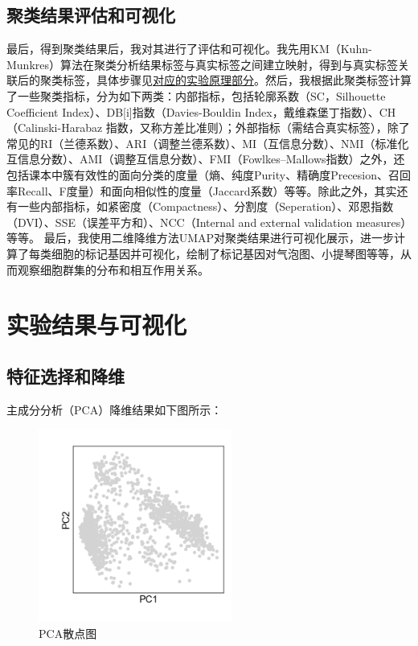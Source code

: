 \documentclass {article}
\begin{document}
	\subsection{聚类结果评估和可视化}
	最后，得到聚类结果后，我对其进行了评估和可视化。我先用KM（Kuhn-Munkres）算法在聚类分析结果标签与真实标签之间建立映射，得到与真实标签关联后的聚类标签，具体步骤见\hyperref[KM算法原理]{对应的实验原理部分}。然后，我根据此聚类标签计算了一些聚类指标，分为如下两类：内部指标，包括轮廓系数（SC，Silhouette Coefficient Index）、DB[i]指数（Davies-Bouldin Index，戴维森堡丁指数）、CH（Calinski-Harabaz 指数，又称方差比准则）；外部指标（需结合真实标签），除了常见的RI（兰德系数）、ARI（调整兰德系数）、MI（互信息分数）、NMI（标准化互信息分数）、AMI（调整互信息分数）、FMI（Fowlkes–Mallows指数）之外，还包括课本中簇有效性的面向分类的度量（熵、纯度Purity、精确度Precesion、召回率Recall、F度量）和面向相似性的度量（Jaccard系数）等等。除此之外，其实还有一些内部指标，如紧密度（Compactness）、分割度（Seperation）、邓恩指数（DVI）、SSE（误差平方和）、NCC（Internal and external validation measures）等等。
	最后，我使用二维降维方法UMAP对聚类结果进行可视化展示，进一步计算了每类细胞的标记基因并可视化，绘制了标记基因对气泡图、小提琴图等等，从而观察细胞群集的分布和相互作用关系。
	
	\section{实验结果与可视化}
	\subsection{特征选择和降维}
	主成分分析（PCA）降维结果如下图所示：
	\begin{figure}[H]
		\centering
		\includegraphics[width=2.5in,height=2.5in]{figures/fig1.png}
		\caption{PCA散点图}
	\end{figure}
	
\end{document}
